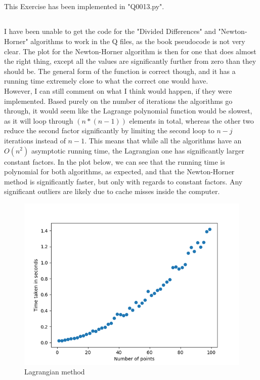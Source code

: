 \subsection{}
This Exercise has been implemented in "Q0013.py".
\subsection{}
I have been unable to get the code for the "Divided Differences" and "Newton-Horner" algorithms to work in the Q files, as the book pseudocode is not very clear. The plot for the Newton-Horner algorithm is then for one that does almost the right thing, except all the values are significantly further from zero than they should be. The general form of the function is correct though, and it has a running time extremely close to what the correct one would have.\\
However, I can still comment on what I think would happen, if they were implemented. Based purely on the number of iterations the algorithms go through, it would seem like the Lagrange polynomial function would be slowest, as it will loop through $(n * (n-1))$ elements in total, whereas the other two reduce the second factor significantly by limiting the second loop to $n-j$ iterations instead of $n-1$. This means that while all the algorithms have an $O(n^2)$ asymptotic running time, the Lagrangian one has significantly larger constant factors. In the plot below, we can see that the running time is polynomial for both algorithms, as expected, and that the Newton-Horner method is significantly faster, but only with regards to constant factors. Any significant outliers are likely due to cache misses inside the computer.\\
\begin{figure}[ht]
  \caption{Lagrangian method}
  \includegraphics[width=\linewidth]{timeplot}
\end{figure}

